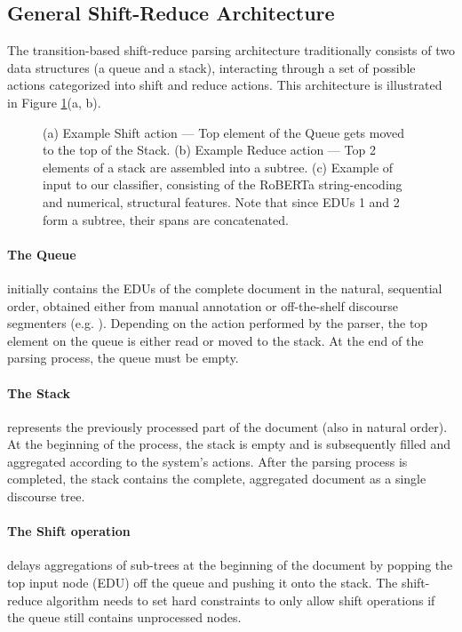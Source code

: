 \documentclass[11pt]{article}
\begin{document}
\subsection{General Shift-Reduce Architecture}
\label{architecture}
The transition-based shift-reduce parsing architecture traditionally consists of two data structures (a queue and a stack), interacting through a set of possible actions 
categorized into shift and reduce actions. This architecture is illustrated in Figure \ref{all-actions}(a, b).
\begin{figure}
    \caption{(a) Example Shift action --- Top element of the Queue gets moved to the top of the Stack. (b) Example Reduce action --- Top 2 elements of a stack are assembled into a subtree. (c) Example of input to our classifier, consisting of the RoBERTa string-encoding and numerical, structural features. Note that since EDUs 1 and 2 form a subtree, their spans are concatenated.}
    \label{all-actions}
\end{figure}

\paragraph{The Queue}initially contains the EDUs of the complete document in the natural, sequential order, obtained either from manual annotation or off-the-shelf discourse segmenters (e.g.  \cite{li-sun-joty-ijcai-18}). Depending on the action performed by the parser, the top element on the queue is either read or moved to the stack. At the end of the parsing process, the queue must be empty.

\paragraph{The Stack}represents the previously processed part of the document (also in natural order). At the beginning of the process, the stack is empty and is subsequently filled and aggregated according to the system's actions. After the parsing process is completed, the stack contains the complete, aggregated document as a single discourse tree. 
 


\paragraph{The Shift operation} delays aggregations of sub-trees at the beginning of the document by popping the top input node (EDU) off the queue and pushing it onto the stack. The shift-reduce algorithm needs to set hard constraints to only allow shift operations if the queue still contains unprocessed nodes.
\end{document}
